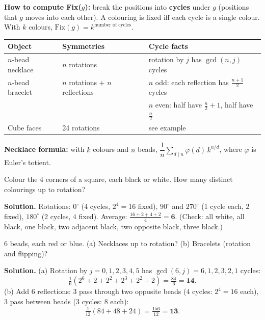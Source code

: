 \documentclass[11pt,a4paper,openany]{report}
\begin{document}
\textbf{How to compute Fix($g$):} break the positions into \textbf{cycles} under $g$ (positions that $g$ moves
into each other). A colouring is fixed iff each cycle is a single colour. With $k$ colours,
$\text{Fix}(g)=k^{\text{number of cycles}}$.

\begin{center}\small
\begin{tabular}{lll}
\toprule
Object & Symmetries & Cycle facts\\\midrule
$n$-bead necklace & $n$ rotations & rotation by $j$ has $\gcd(n,j)$ cycles\\
$n$-bead bracelet & $n$ rotations $+$ $n$ reflections & $n$ odd: each reflection has $\frac{n+1}2$ cycles\\
 & & $n$ even: half have $\frac n2+1$, half have $\frac n2$\\
Cube faces & 24 rotations & see example\\
\bottomrule
\end{tabular}
\end{center}
\textbf{Necklace formula:} with $k$ colours and $n$ beads, $\dfrac1n\sum_{d\mid n}\varphi(d)\,k^{n/d}$, where $\varphi$ is Euler's totient.

\begin{example}
Colour the 4 corners of a square, each black or white. How many distinct colourings up to rotation?

\textbf{Solution.} Rotations: $0^\circ$ (4 cycles, $2^4=16$ fixed), $90^\circ$ and $270^\circ$ (1 cycle each, $2$ fixed),
$180^\circ$ (2 cycles, $4$ fixed). Average: $\frac{16+2+4+2}{4}=\mathbf{6}$.
(Check: all white, all black, one black, two adjacent black, two opposite black, three black.)
\end{example}

\begin{example}
6 beads, each red or blue. (a) Necklaces up to rotation? (b) Bracelets (rotation and flipping)?

\textbf{Solution.} (a) Rotation by $j=0,1,2,3,4,5$ has $\gcd(6,j)=6,1,2,3,2,1$ cycles:
\[\tfrac16(2^6+2+2^2+2^3+2^2+2)=\tfrac{84}6=\mathbf{14}.\]
(b) Add 6 reflections: 3 pass through two opposite beads (4 cycles: $2^4=16$ each), 3 pass between beads (3 cycles: $8$ each):
\[\tfrac1{12}(84+48+24)=\tfrac{156}{12}=\mathbf{13}.\]
\end{example}
\end{document}
